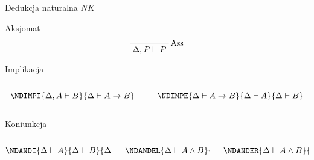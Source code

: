 \documentclass{beamer}
\newcommand{\imp}{\rightarrow}
\newcommand{\NDASS}[1]{\prfbyaxiom{Ass}{#1}}
\begin{document}
\begin{frame}{Dedukcja naturalna $NK$}

  \pause

  \begin{block}{Aksjomat}
    $$ \NDASS{\Delta, P \vdash P} $$
  \end{block}

  \pause

  \begin{block}{Implikacja}
    \begin{columns}
      \begin{column}{0.5\textwidth}
        $$
        \NDIMPI {\Delta, A \vdash B}
          {\Delta \vdash A \imp B}
        $$
      \end{column}

      \begin{column}{0.5\textwidth}
        $$
        \NDIMPE {\Delta \vdash A \imp B} {\Delta \vdash A}
          {\Delta \vdash B}
        $$
      \end{column}
    \end{columns}
  \end{block}

  \pause

  \begin{block}{Koniunkcja}
    \begin{columns}
      \begin{column}{0.33\textwidth}
        $$
        \NDANDI {\Delta \vdash A} {\Delta \vdash B} 
          {\Delta \vdash A \land B}
        $$
      \end{column}

      \begin{column}{0.33\textwidth}
        $$
        \NDANDEL {\Delta \vdash A \land B}
          {\Delta \vdash A}
        $$
      \end{column}

      \begin{column}{0.33\textwidth}
        $$
        \NDANDER {\Delta \vdash A \land B}
          {\Delta \vdash B}
        $$
      \end{column}
    \end{columns}
  \end{block}
\end{frame}
\end{document}
